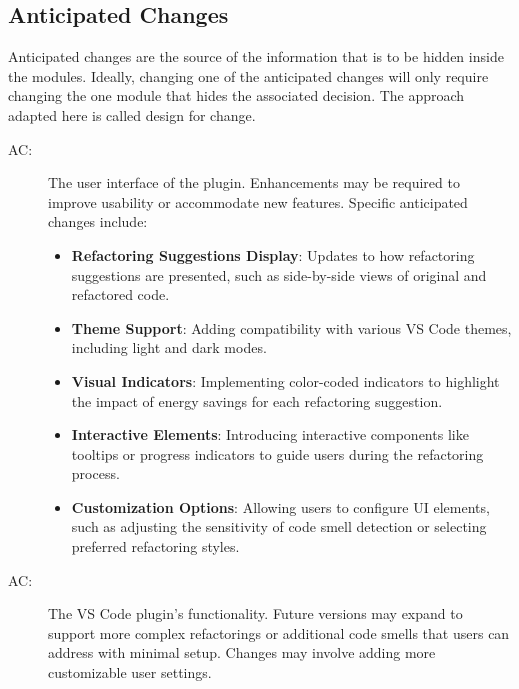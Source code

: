 \documentclass[12pt, titlepage]{article}
\newcounter{acnum}
\newcommand{\actheacnum}{AC\theacnum}
\begin{document}
\subsection{Anticipated Changes} \label{SecAchange}

Anticipated changes are the source of the information that is to be hidden
inside the modules. Ideally, changing one of the anticipated changes will only
require changing the one module that hides the associated decision. The approach
adapted here is called design for
change.

\begin{description}
  \item[ \actheacnum \label{acUserInterface}:] The user interface of the plugin. Enhancements may be required to improve usability or accommodate new features. Specific anticipated changes include:
      \begin{itemize}
          \item \textbf{Refactoring Suggestions Display}: Updates to how refactoring suggestions are presented, such as side-by-side views of original and refactored code.
          \item \textbf{Theme Support}: Adding compatibility with various VS Code themes, including light and dark modes.
          \item \textbf{Visual Indicators}: Implementing color-coded indicators to highlight the impact of energy savings for each refactoring suggestion.
          \item \textbf{Interactive Elements}: Introducing interactive components like tooltips or progress indicators to guide users during the refactoring process.
          \item \textbf{Customization Options}: Allowing users to configure UI elements, such as adjusting the sensitivity of code smell detection or selecting preferred refactoring styles.
      \end{itemize}
  
  \item[ \actheacnum \label{acVSCodePlugin}:] The VS Code plugin's
    functionality. Future versions may expand to support more complex refactorings
    or additional code smells that users can address with minimal setup. Changes
    may involve adding more customizable user settings.
    

\end{description}
\end{document}
